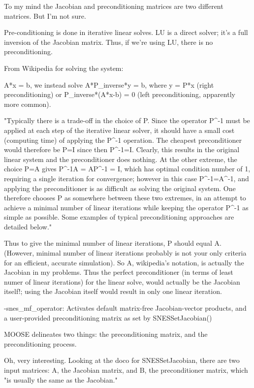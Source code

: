 To my mind the Jacobian and preconditioning matrices are two different matrices. But I'm not sure.

Pre-conditioning is done in iterative linear solves. LU is a direct solver; it's a full inversion of the Jacobian matrix. Thus, if we're using LU, there is no preconditioning.

From Wikipedia for solving the system:

A*x = b, we instead solve A*P_inverse*y = b, where y = P*x (right preconditioning) or P_inverse*(A*x-b) = 0 (left preconditioning, apparently more common).

"Typically there is a trade-off in the choice of P. Since the operator P^{-1} must be applied at each step of the iterative linear solver, it should have a small cost (computing time) of applying the P^{-1} operation. The cheapest preconditioner would therefore be P=I since then P^{-1}=I. Clearly, this results in the original linear system and the preconditioner does nothing. At the other extreme, the choice P=A gives P^{-1}A = AP^{-1} = I, which has optimal condition number of 1, requiring a single iteration for convergence; however in this case P^{-1}=A^{-1}, and applying the preconditioner is as difficult as solving the original system. One therefore chooses P as somewhere between these two extremes, in an attempt to achieve a minimal number of linear iterations while keeping the operator P^{-1} as simple as possible. Some examples of typical preconditioning approaches are detailed below."

Thus to give the minimal number of linear iterations, P should equal A. (However, minimal number of linear iterations probably is not your only criteria for an efficient, accurate simulation). So A, wikipedia's notation, is actually the Jacobian in my problems. Thus the perfect preconditioner (in terms of least numer of linear iterations) for the linear solve, would actually be the Jacobian itself!; using the Jacobian itself would result in only one linear iteration.

-snes_mf_operator: Activates default matrix-free Jacobian-vector products, and a user-provided preconditioning matrix as set by SNESSetJacobian()

MOOSE delineates two things: the preconditioning matrix, and the preconditioning process.

Oh, very interesting. Looking at the doco for SNESSetJacobian, there are two input matrices: A, the Jacobian matrix, and B, the preconditioner matrix, which "is usually the same as the Jacobian."


